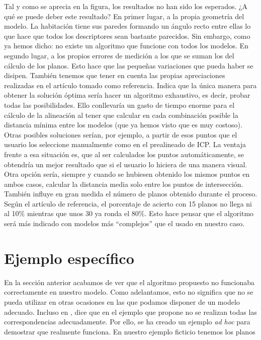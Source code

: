 Tal y como se aprecia en la figura, los resultados no han sido los esperados. ¿A qué se puede deber este resultado? En primer lugar, a la propia geometría del modelo. La habitación tiene sus paredes formando un ángulo recto entre ellas lo que hace que todos los descriptores sean bastante parecidos. Sin embargo, como ya hemos dicho: no existe un algoritmo que funcione con todos los modelos. En segundo lugar, a los propios errores de medición a los que se suman los del cálculo de los planos. Esto hace que las pequeñas variaciones que pueda haber se disipen. También tenemos que tener en cuenta las propias apreciaciones realizadas en el artículo tomado como referencia. Indica que la única manera para obtener la solución óptima sería hacer un algoritmo exhaustivo, es decir, probar todas las posibilidades. Ello conllevaría un gasto de tiempo enorme para el cálculo de la alineación al tener que calcular en cada combinación posible la distancia mínima entre los modelos (que ya hemos visto que es muy costoso). Otras posibles soluciones serían, por ejemplo, a partir de esos puntos que el usuario los seleccione manualmente como en el prealineado de ICP. La ventaja frente a esa situación es, que al ser calculados los puntos automáticamente, se obtendría un mejor resultado que si el usuario lo hiciera de una manera visual. Otra opción sería, siempre y cuando se hubiesen obtenido los mismos puntos en ambos casos, calcular la distancia media solo entre los puntos de intersección. \\

También influye en gran medida el número de planos obtenido durante el proceso. Según el artículo de referencia, el porcentaje de acierto con 15 planos no llega ni al 10\% mientras que unos 30 ya ronda el 80\%. Esto hace pensar que el algoritmo será más indicado con modelos más ``complejos'' que el usado en nuestro caso.

\section{Ejemplo específico}
En la sección anterior acabamos de ver que el algoritmo propuesto no funcionaba correctamente en nuestro modelo. Como adelantamos, esto no significa que no se pueda utilizar en otras ocasiones en las que podamos disponer de un modelo adecuado. Incluso en \cite{theiler2012automatic}, dice que en el ejemplo que propone no se realizan todas las correspondencias adecuadamente. Por ello, se ha creado un ejemplo \textit{ad hoc} para demostrar que realmente funciona. En nuestro ejemplo ficticio tenemos los planos

